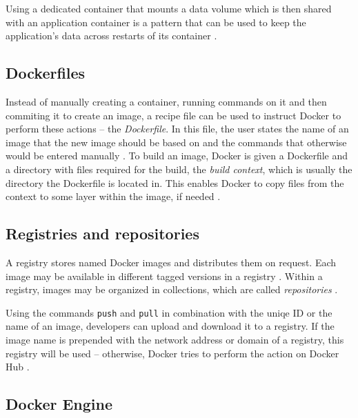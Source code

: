     Using a dedicated container that mounts a data volume which is then shared with an application container is a pattern that can be used to keep the application's data across restarts of its container \cite{Docker2016Docker}.


  \subsection{Dockerfiles} %
  \label{sub:dockerfiles}
    Instead of manually creating a container, running commands on it and then commiting it to create an image, a recipe file can be used to instruct Docker to perform these actions -- the \emph{Dockerfile}. In this file, the user states the name of an image that the new image should be based on and the commands that otherwise would be entered manually \cite{Docker2016Docker}.
    To build an image, Docker is given a Dockerfile and a directory with files required for the build, the \emph{build context}, which is usually the directory the Dockerfile is located in. This enables Docker to copy files from the context to some layer within the image, if needed \cite{Docker2016Docker}.

  \subsection{Registries and repositories} %
  \label{sub:registries_and_repositories}
    A registry stores named Docker images and distributes them on request. Each image may be available in different tagged versions in a registry \cite{Docker2016Docker}.
    Within a registry, images may be organized in collections, which are called \emph{repositories} \cite{Docker2016Docker}.

    Using the commands \texttt{push} and \texttt{pull} in combination with the uniqe \ac{ID} or the name of an image, developers can upload and download it to a registry. If the image name is prepended with the network address or domain of a registry, this registry will be used -- otherwise, Docker tries to perform the action on Docker Hub \cite{Docker2016Docker}.

  \subsection{Docker Engine} %
  \label{sub:docker_engine}

